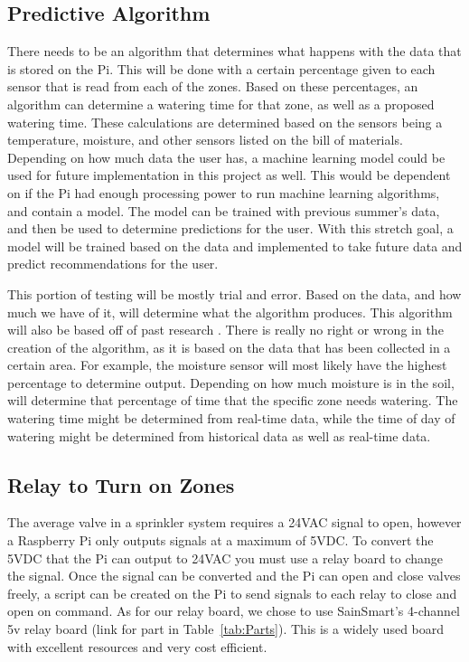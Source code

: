 \documentclass[letterpaper, 10 pt, conference]{ieeeconf}  %
\begin{document}
\subsection{Predictive Algorithm}
There needs to be an algorithm that determines what happens with the data that is stored on the Pi. This will be done with a certain percentage given to each sensor that is read from each of the zones. Based on these percentages, an algorithm can determine a watering time for that zone, as well as a proposed watering time. These calculations are determined based on the sensors being a temperature, moisture, and other sensors listed on the bill of materials. Depending on how much data the user has, a machine learning model could be used for future implementation in this project as well. This would be dependent on if the Pi had enough processing power to run machine learning algorithms, and contain a model. The model can be trained with previous summer's data, and then be used to determine predictions for the user. With this stretch goal, a model will be trained based on the data and implemented to take future data and predict recommendations for the user. 

This portion of testing will be mostly trial and error. Based on the data, and how much we have of it, will determine what the algorithm produces. This algorithm will also be based off of past research \cite{SmartSprinkler}. There is really no right or wrong in the creation of the algorithm, as it is based on the data that has been collected in a certain area. For example, the moisture sensor will most likely have the highest percentage to determine output. Depending on how much moisture is in the soil, will determine that percentage of time that the specific zone needs watering. The watering time might be determined from real-time data, while the time of day of watering might be determined from historical data as well as real-time data. 

\subsection{Relay to Turn on Zones}
 The average valve in a sprinkler system requires a 24VAC signal to open, however a Raspberry Pi only outputs signals at a maximum of 5VDC. To convert the 5VDC that the Pi can output to 24VAC you must use a relay board to change the signal. Once the signal can be converted and the Pi can open and close valves freely, a script can be created on the Pi to send signals to each relay to close and open on command.
As for our relay board, we chose to use SainSmart's \cite{relayBoard} 4-channel 5v relay board (link for part in Table~\ref{tab:Parts}). This is a widely used board with excellent resources and very cost efficient.
\end{document}
